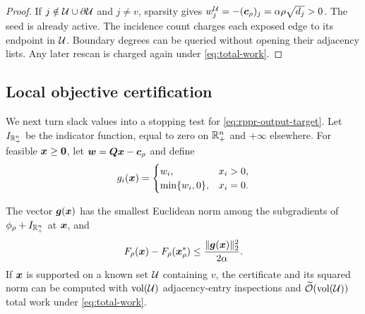 \begin{proof}
If $j\notin \mathcal{U}\cup\partial \mathcal{U}$ and $j\neq v$, sparsity gives
$w_j^{\mathcal{U}}=-(\bm{c}_\rho)_j=\alpha\rho\sqrt{d_j}>0$.  The seed is already active.
The incidence count charges each exposed edge to its endpoint in $\mathcal{U}$.
Boundary degrees can be queried without opening their adjacency lists.
Any later rescan is charged again under \cref{eq:total-work}.
\end{proof}

\subsection{Local objective certification}

We next turn slack values into a stopping test for
\cref{eq:rppr-output-target}. Let $I_{\mathbb{R}_+^n}$ be the indicator function,
equal to zero on $\mathbb{R}_+^n$ and $+\infty$ elsewhere.
For feasible $\bm{x}\geq\bm{0}$, let $\bm{w}=\bm{Q}\bm{x}-\bm{c}_\rho$ and define
\begin{equation}
 g_i(\bm{x})=
 \begin{cases}
  w_i,&x_i>0,\\
  \min\{w_i,0\},&x_i=0.
 \end{cases}
 \label{eq:minimal-kkt-subgradient}
\end{equation}

\begin{lemma}
\label{lem:kkt-gap-certificate}
The vector $\bm{g}(\bm{x})$ has the smallest Euclidean norm among the
subgradients of $\phi_\rho+I_{\mathbb{R}_+^n}$ at $\bm{x}$, and
\begin{equation*}
 F_\rho(\bm{x})-F_\rho(\bm{x}_\rho^*)
 \leq\frac{\lVert\bm{g}(\bm{x})\rVert_2^2}{2\alpha}.
\end{equation*}
If $\bm{x}$ is supported on a known set $\mathcal{U}$ containing $v$, the certificate
and its squared norm can be computed with $\operatorname{vol}(\mathcal{U})$ adjacency-entry
inspections and $\widetilde{\mathcal{O}}(\operatorname{vol}(\mathcal{U}))$ total work under
\cref{eq:total-work}.
\end{lemma}

